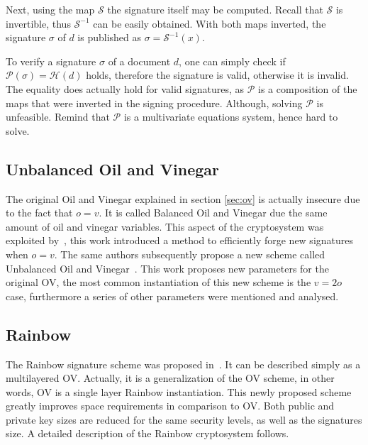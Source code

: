 \documentclass{ufsctex/ufsctex}
\begin{document}
Next, using the map $\mathcal{S}$ the signature itself may be computed. Recall
that $\mathcal{S}$ is invertible, thus $\mathcal{S}^{-1}$ can be easily
obtained. With both maps inverted, the signature $\sigma$ of $d$ is published
as $\sigma = \mathcal{S}^{-1}(x)$.

To verify a signature $\sigma$ of a document $d$, one can simply check if
$\mathcal{P}(\sigma) = \mathcal{H}(d)$ holds, therefore the signature is valid,
otherwise it is invalid. The equality does actually hold for valid signatures,
as $\mathcal{P}$ is a composition of the maps that were inverted in the signing
procedure. Although, solving $\mathcal{P}$ is unfeasible. Remind that
$\mathcal{P}$ is a multivariate equations system, hence hard to solve.

\subsection{Unbalanced Oil and Vinegar}

The original Oil and Vinegar explained in section \ref{sec:ov} is actually
insecure due to the fact that $o = v$. It is called Balanced Oil and Vinegar
due the same amount of oil and vinegar variables. This aspect of the
cryptosystem was exploited by~\cite{kipnis1998cryptanalysis}, this work
introduced a method to efficiently forge new signatures when $o = v$. The same
authors subsequently propose a new scheme called Unbalanced Oil and
Vinegar~\cite{kipnis1999unbalanced}. This work proposes new parameters for the
original OV, the most common instantiation of this new scheme is the $v = 2o$
case, furthermore a series of other parameters were mentioned and analysed.

\subsection{Rainbow}\label{sec:rainbow}

The Rainbow signature scheme was proposed in~\cite{ding2005rainbow}. It can be
described simply as a multilayered OV. Actually, it is a generalization of the
OV scheme, in other words, OV is a single layer Rainbow instantiation. This
newly proposed scheme greatly improves space requirements in comparison to OV.
Both public and private key sizes are reduced for the same security levels, as
well as the signatures size. A detailed description of the Rainbow cryptosystem
follows.
\end{document}
